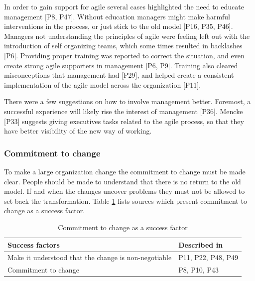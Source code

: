 \documentclass[preprint,authoryear,12pt]{elsarticle}
\begin{document}

In order to gain support for agile several cases highlighted the need to educate
management [P8, P47].
Without education managers might make harmful interventions in the process, or
just stick to the old model [P16, P35, P46].
Managers not understanding the principles of agile were feeling left out with
the introduction of self organizing teams, which some times resulted in
backlashes [P6]. Providing proper training was reported to correct the
situation, and even create strong agile supporters in management [P6, P9].
Training also cleared misconceptions that management had [P29], and helped
create a consistent implementation of the agile model across the organization
[P11].

There were a few suggestions on how to involve management better. Foremost, a
successful experience will likely rise the interest of management [P36].
Mencke [P33] suggests giving executives tasks related to the agile process,
so that they have better visibility of the new way of working. 


\subsubsection{Commitment to change}

To make a large organization change the commitment to change must be made clear.
People should be made to understand that there is no return to the old model.
If and when the changes uncover problems they must not be allowed to set back
the transformation. Table \ref{table:success_commitment} lists sources which
present commitment to change as a success factor.

\begin{table}[h]
    \centering
    \begin{tabular}{ >{\raggedright\arraybackslash}p{}
                     >{\raggedright\arraybackslash}p{} }
        \toprule
        Success factors  &  Described in \\
        \midrule
        Make it understood that the change is non-negotiable  &
                P11, P22, P48, P49  \\
        Commitment to change  &
                P8, P10, P43  \\
        \bottomrule
    \end{tabular}
    \caption{Commitment to change as a success factor}
    \label{table:success_commitment}
\end{table}
\end{document}
